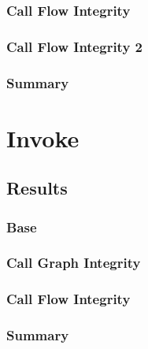 \subsubsection{Call Flow Integrity}

\subsubsection{Call Flow Integrity 2}

\subsubsection{Summary}



\section{Invoke}

\subsection*{Results}

\subsubsection{Base}

\subsubsection{Call Graph Integrity}

\subsubsection{Call Flow Integrity}

\subsubsection{Summary}


